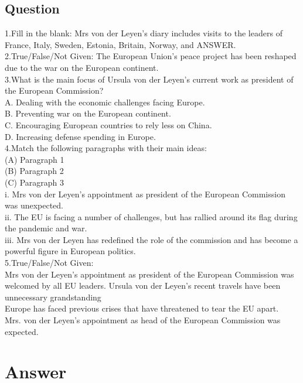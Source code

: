 \documentclass[10pt, a4paper, oneside]{article}
\begin{document}
\begin{spacing}{2.0}
\subsection{Question}

1.Fill in the blank: Mrs von der Leyen's diary includes visits to the leaders of France, Italy, Sweden, Estonia, Britain, Norway, and ANSWER.
\\
2.True/False/Not Given: The European Union's peace project has been reshaped due to the war on the European continent.\\

3.What is the main focus of Ursula von der Leyen's current work as president of the European Commission?\\
A. Dealing with the economic challenges facing Europe.\\
B. Preventing war on the European continent.\\
C. Encouraging European countries to rely less on China.\\
D. Increasing defense spending in Europe.\\

4.Match the following paragraphs with their main ideas:\\
(A) Paragraph 1\\
(B) Paragraph 2\\
(C) Paragraph 3\\

i. Mrs von der Leyen's appointment as president of the European Commission was unexpected.\\
ii. The EU is facing a number of challenges, but has rallied around its flag during the pandemic and war.\\
iii. Mrs von der Leyen has redefined the role of the commission and has become a powerful figure in European politics.\\

5.True/False/Not Given: \\
Mrs von der Leyen's appointment as president of the European Commission was welcomed by all EU leaders.
Ursula von der Leyen's recent travels have been unnecessary grandstanding\\

Europe has faced previous crises that have threatened to tear the EU apart.\\

Mrs. von der Leyen's appointment as head of the European Commission was expected.\\
\section{Answer}

\end{spacing}
\end{document}

